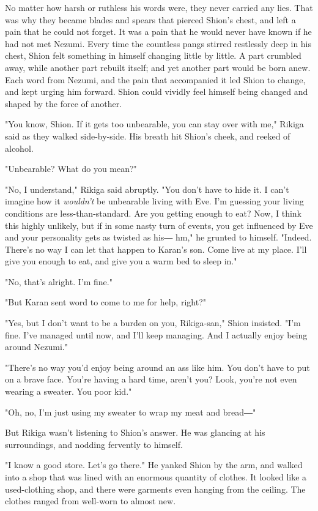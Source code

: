 No matter how harsh or ruthless his words were, they never carried any
lies. That was why they became blades and spears that pierced Shion's
chest, and left a pain that he could not forget. It was a pain that he
would never have known if he had not met Nezumi. Every time the
countless pangs stirred restlessly deep in his chest, Shion felt
something in himself changing little by little. A part crumbled away,
while another part rebuilt itself; and yet another part would be born
anew. Each word from Nezumi, and the pain that accompanied it led Shion
to change, and kept urging him forward. Shion could vividly feel himself
being changed and shaped by the force of another.

"You know, Shion. If it gets too unbearable, you can stay over with me,"
Rikiga said as they walked side-by-side. His breath hit Shion's cheek,
and reeked of alcohol.

"Unbearable? What do you mean?"

"No, I understand," Rikiga said abruptly. "You don't have to hide it. I
can't imagine how it \emph{wouldn't} be unbearable living with Eve. I'm
guessing your living conditions are less-than-standard. Are you getting
enough to eat? Now, I think this highly unlikely, but if in some nasty
turn of events, you get influenced by Eve and your personality gets as
twisted as his― hm," he grunted to himself. "Indeed. There's no way I
can let that happen to Karan's son. Come live at my place. I'll give you
enough to eat, and give you a warm bed to sleep in."

"No, that's alright. I'm fine."

"But Karan sent word to come to me for help, right?"

"Yes, but I don't want to be a burden on you, Rikiga-san," Shion
insisted. "I'm fine. I've managed until now, and I'll keep managing. And
I actually enjoy being around Nezumi."

"There's no way you'd enjoy being around an ass like him. You don't have
to put on a brave face. You're having a hard time, aren't you? Look,
you're not even wearing a sweater. You poor kid."

"Oh, no, I'm just using my sweater to wrap my meat and bread―"

But Rikiga wasn't listening to Shion's answer. He was glancing at his
surroundings, and nodding fervently to himself.

"I know a good store. Let's go there." He yanked Shion by the arm, and
walked into a shop that was lined with an enormous quantity of clothes.
It looked like a used-clothing shop, and there were garments even
hanging from the ceiling. The clothes ranged from well-worn to almost
new.

